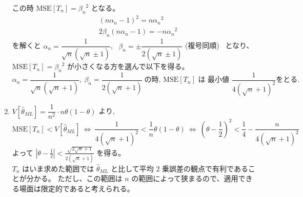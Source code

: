 \documentclass[./main.tex]{subfiles}
\begin{document}
\begin{enumerate}
        この時 $\mathrm{MSE} [T_n] = {\beta_n}^2$ となる。
        \begin{subequations}
            \begin{align}
                &(n \alpha_n - 1)^2 = n {\alpha_n}^2 \label{eq:2024-suri-3-mse-a}\\
                &2 \beta_n (n \alpha_n - 1) = - n { \alpha_n}^2 \label{eq:2024-suri-3-mse-b}
            \end{align}
        \end{subequations}
        を解くと $\alpha_n = \dfrac{1}{\sqrt{n} (\sqrt{n} \pm 1)}$, \ $\beta_n = \pm \dfrac{1}{2 (\sqrt{n} \pm 1)}$ (複号同順) \ となり、
        $\mathrm{MSE} [T_n] = {\beta_n}^2$ が小さくなる方を選んで以下を得る。
        \begin{equation*}
            \alpha_n = \frac{1}{\sqrt{n} ( \sqrt{n} + 1)}, \
                \beta_n = \frac{1}{2 (\sqrt{n} + 1)} \ 
                \mbox{の時, } \mathrm{MSE} [T_n] \mbox{ は 最小値 } 
                \frac{1}{4 ( \sqrt{n} + 1)^2} \mbox{をとる.}
        \end{equation*}

        \item $V [\hat{\theta}_{ML}] = \dfrac{1}{n^2} \cdot n \theta (1- \theta)$ より,
        \begin{equation*}
            \mathrm{MSE} [T_n] < V [\hat{\theta}_{ML}]
            \ \iff \
            \frac{1}{4 (\sqrt{n} + 1)^2} < \frac{1}{n} \theta (1 - \theta)
            \ \iff \
            \left( \theta - \frac{1}{2} \right)^2
                < \frac{1}{4} - \frac{n}{ 4 (\sqrt{n} + 1)^2}
        \end{equation*}
        よって $\displaystyle \left| \theta - \frac{1}{2} \right| < \frac{\sqrt{ 2 \sqrt{n} + 1}}{2 (\sqrt{n} + 1) }$ を得る。\\
        $T_n$ はいま求めた範囲では $\hat{\theta}_{ML}$ と比して平均 2 乗誤差の観点で有利であることが分かる。
        ただし、この範囲は $n$ の範囲によって狭まるので、適用できる場面は限定的であると考えられる。

        
    \end{enumerate}

\end{document}
